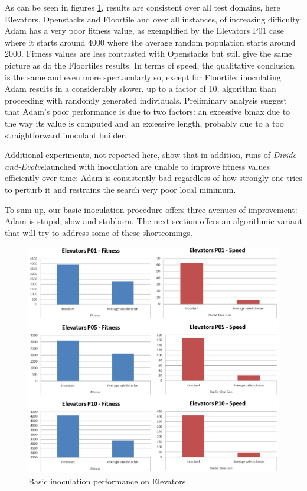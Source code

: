 \documentclass[english]{DESCARWINreport}
\newcommand{\dae}{{\em Divide-and-Evolve}}
\begin{document}
As can be seen in figures \ref{fig:adam_el}, results are consistent over all test domains, here Elevators, Openstacks and Floortile and over all instances, of increasing difficulty: Adam has a very poor fitness value, as exemplified by the Elevators P01 case where it starts around 4000 where the average random population starts around 2000. Fitness values are less contrasted with Openstacks but still give the same picture as do the Floortiles results. In terms of speed, the qualitative conclusion is the same and even more spectacularly so, except for Floortile: inoculating Adam results in a considerably slower, up to a factor of 10, algorithm than proceeding with randomly generated individuals. Preliminary analysis suggest that Adam's poor performance is due to two factors: an excessive bmax due to the way its value is computed and an excessive length, probably due to a too straightforward inoculant builder.

Additional experiments, not reported here, show that in addition, runs of \dae launched with inoculation are unable to improve fitness values efficiently over time: Adam is consistently bad regardless of how strongly one tries to perturb it and restrains the search very poor local minimum.

To sum up, our basic inoculation procedure offers three avenues of improvement: Adam is stupid, slow and stubborn. The next section offers an algorithmic variant that will try to address some of these shortcomings.

\begin{figure}
	\centering
		\includegraphics[width=\textwidth]{pics/Elevators.eps}
	\caption{Basic inoculation performance on Elevators}
	\label{fig:adam_el}
\end{figure}
\end{document}
